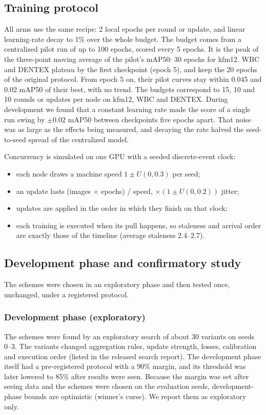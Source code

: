 \documentclass[pdflatex,sn-mathphys-num]{sn-jnl}
\begin{document}
\subsection{Training protocol}\label{sec:protocol}
All arms use the same recipe: 2 local epochs per round or update, and linear learning-rate decay to 1\% over the whole budget. The budget comes from a centralized pilot run of up to 100 epochs, scored every 5 epochs. It is the peak of the three-point moving average of the pilot's mAP50: 30 epochs for kfm12. WBC and DENTEX plateau by the first checkpoint (epoch 5), and keep the 20 epochs of the original protocol. From epoch 5 on, their pilot curves stay within 0.045 and 0.02 mAP50 of their best, with no trend. The budgets correspond to 15, 10 and 10 rounds or updates per node on kfm12, WBC and DENTEX. During development we found that a constant learning rate made the score of a single run swing by $\pm0.02$ mAP50 between checkpoints five epochs apart. That noise was as large as the effects being measured, and decaying the rate halved the seed-to-seed spread of the centralized model.

Concurrency is simulated on one GPU with a seeded discrete-event clock:
\begin{itemize}
\item each node draws a machine speed $1\pm U(0,0.3)$ per seed;
\item an update lasts (images $\times$ epochs) / speed, $\times(1\pm U(0,0.2))$ jitter;
\item updates are applied in the order in which they finish on that clock;
\item each training is executed when its pull happens, so staleness and arrival order are exactly those of the timeline (average staleness 2.4--2.7).
\end{itemize}

\subsection{Development phase and confirmatory study}\label{sec:protocols}
The schemes were chosen in an exploratory phase and then tested once, unchanged, under a registered protocol.

\subsubsection{Development phase (exploratory)}\label{sec:dev}
The schemes were found by an exploratory search of about 30 variants on seeds 0--3. The variants changed aggregation rules, update strength, losses, calibration and execution order (listed in the released search report). The development phase itself had a pre-registered protocol with a 90\% margin, and its threshold was later lowered to 85\% after results were seen. Because the margin was set after seeing data and the schemes were chosen on the evaluation seeds, development-phase bounds are optimistic (winner's curse). We report them as exploratory only.
\end{document}
